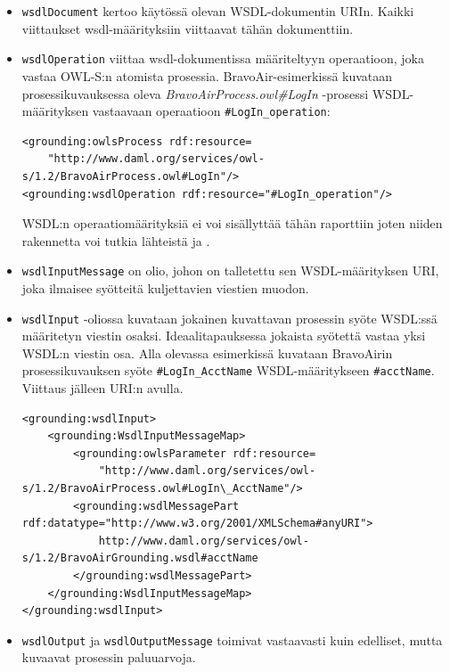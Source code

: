 \documentclass[finnish]{tktltiki2}
\theoremstyle{definition}
\theoremstyle{remark}
\begin{document}
\begin{itemize}
\item \texttt{wsdlDocument} kertoo käytössä olevan WSDL-dokumentin URIn. Kaikki viittaukset wsdl-määrityksiin viittaavat tähän dokumenttiin. 

\item \texttt{wsdlOperation} viittaa wsdl-dokumentissa määriteltyyn operaatioon, joka vastaa OWL-S:n  atomista prosessia. BravoAir-esimerkissä kuvataan
prosessikuvauksessa oleva \textit{BravoAirProcess.owl\#LogIn} -prosessi WSDL-määrityksen vastaavaan operaatioon \texttt{\#LogIn\_operation}: 

\small
\begin{verbatim}
<grounding:owlsProcess rdf:resource=
    "http://www.daml.org/services/owl-s/1.2/BravoAirProcess.owl#LogIn"/>
<grounding:wsdlOperation rdf:resource="#LogIn_operation"/>
\end{verbatim}
\normalsize

WSDL:n operaatiomäärityksiä ei voi sisällyttää tähän raporttiin joten niiden rakennetta voi tutkia lähteistä \cite{daml} ja \cite{WSDL}. 

\item \texttt{wsdlInputMessage} on olio, johon on talletettu sen  WSDL-määrityksen URI, joka ilmaisee syötteitä kuljettavien viestien muodon.  

\item \texttt{wsdlInput} -oliossa kuvataan jokainen kuvattavan prosessin syöte WSDL:ssä  määritetyn viestin osaksi\cite{OWLS}. Ideaalitapauksessa jokaista syötettä vastaa yksi WSDL:n viestin osa. Alla olevassa esimerkissä kuvataan BravoAirin prosessikuvauksen syöte \texttt{\#LogIn\_AcctName} WSDL-määritykseen  \texttt{\#acctName}. Viittaus jälleen URI:n avulla\cite{daml}. 
\footnotesize
\begin{verbatim}
<grounding:wsdlInput>
    <grounding:WsdlInputMessageMap>
        <grounding:owlsParameter rdf:resource=
            "http://www.daml.org/services/owl-s/1.2/BravoAirProcess.owl#LogIn\_AcctName"/>
        <grounding:wsdlMessagePart rdf:datatype="http://www.w3.org/2001/XMLSchema#anyURI">
            http://www.daml.org/services/owl-s/1.2/BravoAirGrounding.wsdl#acctName
        </grounding:wsdlMessagePart>
    </grounding:WsdlInputMessageMap>
</grounding:wsdlInput>
\end{verbatim}
\normalsize

\item \texttt{wsdlOutput} ja \texttt{wsdlOutputMessage} toimivat vastaavasti kuin edelliset, mutta kuvaavat prosessin paluuarvoja.
\end{itemize}
\end{document}
